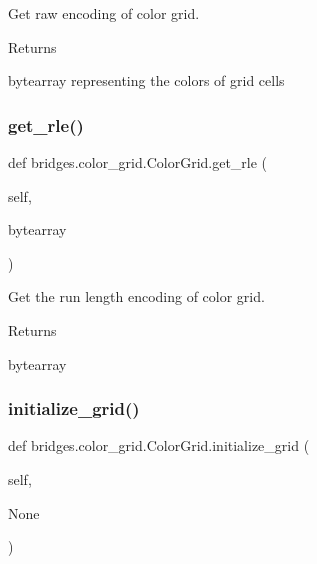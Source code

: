 Get raw encoding of color grid. 

\begin{DoxyReturn}{Returns}


bytearray representing the colors of grid cells 
\end{DoxyReturn}
\mbox{\label{classbridges_1_1color__grid_1_1_color_grid_a48ded4391e60e4f42213fb3711730614}} 
\subsubsection{\texorpdfstring{get\+\_\+rle()}{get\_rle()}}
{\footnotesize\ttfamily def bridges.\+color\+\_\+grid.\+Color\+Grid.\+get\+\_\+rle (\begin{DoxyParamCaption}\item[{}]{self,  }\item[{}]{bytearray }\end{DoxyParamCaption})}



Get the run length encoding of color grid. 

\begin{DoxyReturn}{Returns}


bytearray 
\end{DoxyReturn}
\mbox{\label{classbridges_1_1color__grid_1_1_color_grid_ad2b3ab19751cbf629096a25e31bb7f42}} 
\subsubsection{\texorpdfstring{initialize\+\_\+grid()}{initialize\_grid()}}
{\footnotesize\ttfamily def bridges.\+color\+\_\+grid.\+Color\+Grid.\+initialize\+\_\+grid (\begin{DoxyParamCaption}\item[{}]{self,  }\item[{}]{None }\end{DoxyParamCaption})}



